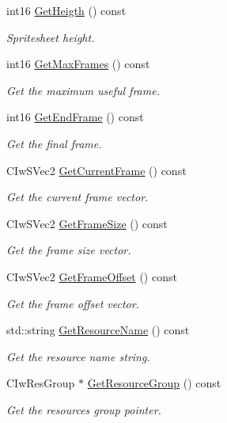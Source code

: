 \begin{DoxyCompactItemize}
int16 \hyperlink{class_iw2_d_sprite_a49d13e536edca20393eb94b84a791352}{GetHeigth} () const 
\begin{DoxyCompactList}\small\item\em Spritesheet height. \end{DoxyCompactList}\item 
int16 \hyperlink{class_iw2_d_sprite_aae02ace7d3b396e6970beb35336cf6ee}{GetMaxFrames} () const 
\begin{DoxyCompactList}\small\item\em Get the maximum useful frame. \end{DoxyCompactList}\item 
int16 \hyperlink{class_iw2_d_sprite_ad6b100b520d3292db3701b08d560fcfa}{GetEndFrame} () const 
\begin{DoxyCompactList}\small\item\em Get the final frame. \end{DoxyCompactList}\item 
CIwSVec2 \hyperlink{class_iw2_d_sprite_a047b73083dd168c92f7ba60607af13ed}{GetCurrentFrame} () const 
\begin{DoxyCompactList}\small\item\em Get the current frame vector. \end{DoxyCompactList}\item 
CIwSVec2 \hyperlink{class_iw2_d_sprite_a8fa97ea61f64088ab3f172f92d6b9280}{GetFrameSize} () const 
\begin{DoxyCompactList}\small\item\em Get the frame size vector. \end{DoxyCompactList}\item 
CIwSVec2 \hyperlink{class_iw2_d_sprite_ab96beb1b7c353aa260743950560e4f79}{GetFrameOffset} () const 
\begin{DoxyCompactList}\small\item\em Get the frame offset vector. \end{DoxyCompactList}\item 
std::string \hyperlink{class_iw2_d_sprite_af039c0ad2ec6ef5ae31600a0566a9020}{GetResourceName} () const 
\begin{DoxyCompactList}\small\item\em Get the resource name string. \end{DoxyCompactList}\item 
CIwResGroup $\ast$ \hyperlink{class_iw2_d_sprite_af14df748a953b1d5b82926587240064d}{GetResourceGroup} () const 
\begin{DoxyCompactList}\small\item\em Get the resources group pointer. \end{DoxyCompactList}\item 

\end{DoxyCompactItemize}
